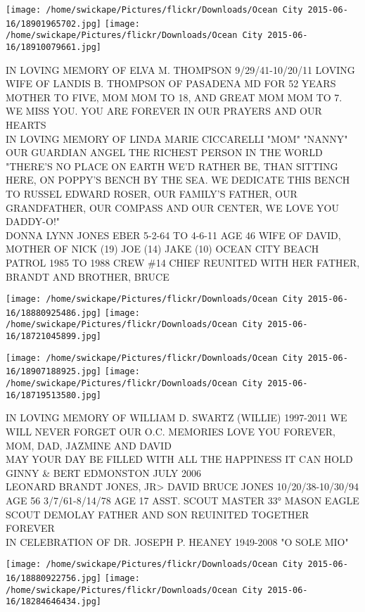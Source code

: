 \documentclass[10pt,letterpaper]{article}
\begin{document}
\texttt{[image: /home/swickape/Pictures/flickr/Downloads/Ocean City 2015-06-16/18901965702.jpg]}
\texttt{[image: /home/swickape/Pictures/flickr/Downloads/Ocean City 2015-06-16/18910079661.jpg]}

IN LOVING MEMORY OF ELVA M. THOMPSON 9/29/41{-}10/20/11 LOVING WIFE OF LANDIS B. THOMPSON OF PASADENA MD FOR 52 YEARS MOTHER TO FIVE, MOM MOM TO 18, AND GREAT MOM MOM TO 7.  WE MISS YOU.  YOU ARE FOREVER IN OUR PRAYERS AND OUR HEARTS\\
IN LOVING MEMORY OF LINDA MARIE CICCARELLI "MOM" "NANNY" OUR GUARDIAN ANGEL THE RICHEST PERSON IN THE WORLD\\
"THERE'S NO PLACE ON EARTH WE'D RATHER BE, THAN SITTING HERE, ON POPPY'S BENCH BY THE SEA. WE DEDICATE THIS BENCH TO RUSSEL EDWARD ROSER, OUR FAMILY'S FATHER, OUR GRANDFATHER, OUR COMPASS AND OUR CENTER, WE LOVE YOU DADDY{-}O!"\\
DONNA LYNN JONES EBER 5{-}2{-}64 TO 4{-}6{-}11 AGE 46 WIFE OF DAVID, MOTHER OF NICK (19) JOE (14) JAKE (10) OCEAN CITY BEACH PATROL 1985 TO 1988 CREW \#14 CHIEF REUNITED WITH HER FATHER, BRANDT AND BROTHER, BRUCE
\pagebreak

\texttt{[image: /home/swickape/Pictures/flickr/Downloads/Ocean City 2015-06-16/18880925486.jpg]}
\texttt{[image: /home/swickape/Pictures/flickr/Downloads/Ocean City 2015-06-16/18721045899.jpg]}

\texttt{[image: /home/swickape/Pictures/flickr/Downloads/Ocean City 2015-06-16/18907188925.jpg]}
\texttt{[image: /home/swickape/Pictures/flickr/Downloads/Ocean City 2015-06-16/18719513580.jpg]}

IN LOVING MEMORY OF WILLIAM D. SWARTZ (WILLIE) 1997{-}2011 WE WILL NEVER FORGET OUR O.C. MEMORIES LOVE YOU FOREVER, MOM, DAD, JAZMINE AND DAVID\\
MAY YOUR DAY BE FILLED WITH ALL THE HAPPINESS IT CAN HOLD GINNY \& BERT EDMONSTON JULY 2006\\
LEONARD BRANDT JONES, JR>  DAVID BRUCE JONES 10/20/38{-}10/30/94 AGE 56 3/7/61{-}8/14/78 AGE 17 ASST. SCOUT MASTER 33° MASON EAGLE SCOUT DEMOLAY FATHER AND SON REUINITED TOGETHER FOREVER\\
IN CELEBRATION OF DR. JOSEPH P. HEANEY 1949{-}2008 "O SOLE MIO"
\pagebreak

\texttt{[image: /home/swickape/Pictures/flickr/Downloads/Ocean City 2015-06-16/18880922756.jpg]}
\texttt{[image: /home/swickape/Pictures/flickr/Downloads/Ocean City 2015-06-16/18284646434.jpg]}
\end{document}
